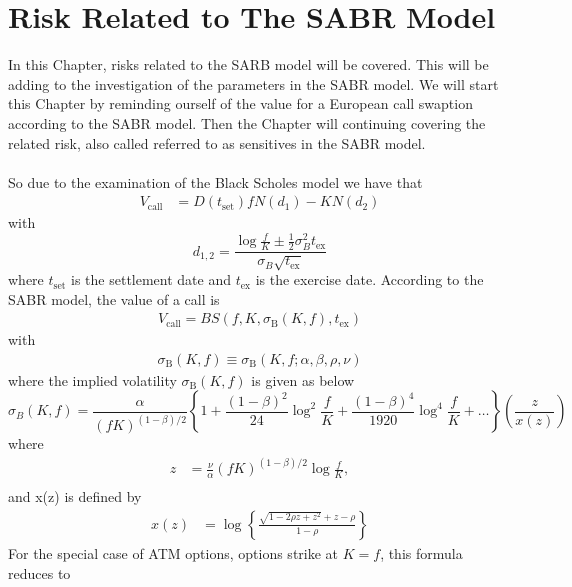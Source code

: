 \section{Risk Related to The SABR Model} \label{risk_mang}
In this Chapter, risks related to the SARB model will be covered. 
This will be adding to the investigation of the parameters in the SABR model.
We will start this Chapter by reminding ourself of the value for
a European call swaption according to the SABR model. 
Then the Chapter will continuing covering the related risk, also called referred to as sensitives in 
the SABR model. 
\\\\
So due to the examination of the Black Scholes model we have that \cite{Smile}
\begin{align}
    V_{\text{call}} &= D(t_{\text{set}})fN(d_1) - KN(d_2) \label{V_call} 
\end{align}
with
\begin{equation}
    d_{1,2} = \frac{\log \frac{f}{K} \pm \frac{1}{2}\sigma_B^2 t_{\text{ex}}}{\sigma_B \sqrt{t_{\text{ex}}}}
\end{equation}
where $t_{\text{set}}$ is the settlement date and $t_{\text{ex}}$ is the exercise date.
According to the SABR model, the value of a call is 
\begin{align}
    V_{\text{call}}= BS(f, K, \sigma_{\text{B}}(K,f),t_{\text{ex}})
\end{align}
with  
\begin{align}
    \sigma_{\text{B}}(K,f) \equiv \sigma_{\text{B}}(K,f;\alpha, \beta, \rho, \nu)
\end{align}
where the implied volatility $\sigma_{\text{B}}(K,f) $ is given as below
\begin{equation}
    \sigma_B(K, f) = \frac{\alpha}{(fK)^{(1-\beta)/2}} \left\{ 1 + \frac{(1-\beta)^2}{24} \log^2 \frac{f}{K} + \frac{(1-\beta)^4}{1920} \log^4 \frac{f}{K} + \ldots \right\} \left( \frac{z}{x(z)} \right)
    \label{eg_2}
\end{equation}
where
\begin{align}
    z &= \frac{\nu}{\alpha}(fK)^{(1-\beta)/2} \log \frac{f}{K}, \\
\end{align}
and x(z) is defined by
\begin{align}
    x(z) &= \log \left\{ \frac{\sqrt{1-2\rho z + z^2} + z - \rho}{1 - \rho} \right\}
\end{align}
For the special case of ATM options, options strike at $K = f$, this formula reduces to
